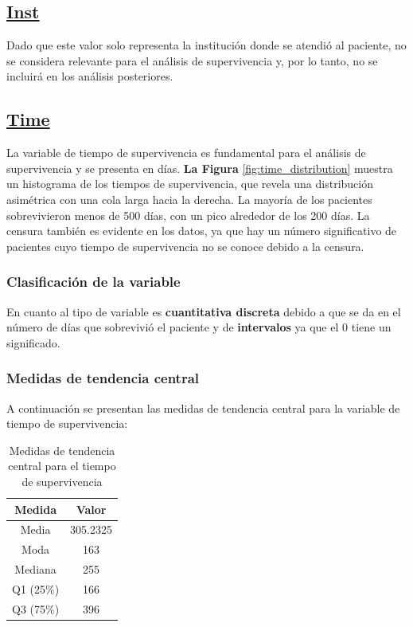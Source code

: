 \documentclass[a4paper,12pt]{article}
\begin{document}
	\subsection*{\underline{Inst}}

	Dado que este valor solo representa la institución donde se atendió al paciente, no se considera relevante para el análisis de supervivencia y, por lo tanto, no se incluirá en los análisis posteriores.

	\subsection*{\underline{Time}}

	La variable de tiempo de supervivencia es fundamental para el análisis de supervivencia y se presenta en días. \textbf{La Figura }\ref{fig:time_distribution} muestra un histograma de los tiempos de supervivencia, que revela una distribución asimétrica con una cola larga hacia la derecha. La mayoría de los pacientes sobrevivieron menos de 500 días, con un pico alrededor de los 200 días. La censura también es evidente en los datos, ya que hay un número significativo de pacientes cuyo tiempo de supervivencia no se conoce debido a la censura.
	
	\subsubsection*{Clasificación de la variable}

	En cuanto al tipo de variable es \textbf{cuantitativa discreta} debido a que se da en el número de días que sobrevivió el paciente y de \textbf{intervalos} ya que el 0 tiene un significado.


\subsubsection*{Medidas de tendencia central}

A continuación se presentan las medidas de tendencia central para la variable de tiempo de supervivencia:

\begin{table}[h!]
    \centering
    \begin{tabular}{|c|c|}
        \hline
        \textbf{Medida} & \textbf{Valor} \\
        \hline
        Media & 305.2325 \\
        \hline
        Moda & 163 \\
        \hline
        Mediana & 255 \\
        \hline
        Q1 (25\%) & 166 \\
        \hline
        Q3 (75\%) & 396 \\
        \hline
    \end{tabular}
    \caption{Medidas de tendencia central para el tiempo de supervivencia}
    \label{tab:medidas_tendencia_central}
\end{table}
\end{document}
